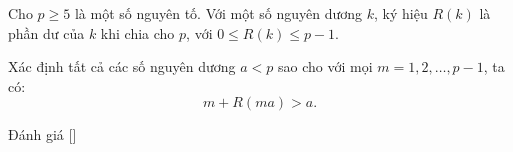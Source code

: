 \ifshowproblem
\begin{problem}\label{problem:RMM-2015-P5}
    Cho \( p \ge 5 \) là một số nguyên tố. Với một số nguyên dương \( k \), ký hiệu \( R(k) \) là phần dư của \( k \) khi chia cho \( p \),
    với \( 0 \le R(k) \le p - 1 \).

    Xác định tất cả các số nguyên dương \( a < p \) sao cho với mọi \( m = 1, 2, \ldots, p - 1 \), ta có:
    \[
        m + R(ma) > a.
    \]
\end{problem}
\fi

\ifshowinfo
Đánh giá [\textbf{}]
\fi